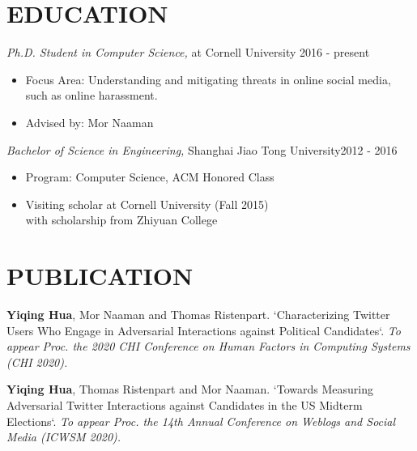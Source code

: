 \documentclass[margin, 10pt]{res} %
\begin{document}
\begin{resume}



\section{EDUCATION}

{\sl Ph.D. Student in Computer Science,} at Cornell University \hfill 2016 - present \\
\begin{itemize}
\item Focus Area: Understanding and mitigating threats in online social media, such as online harassment.
\item Advised by: Mor Naaman
\end{itemize}
{\sl Bachelor of Science in Engineering,} Shanghai Jiao Tong University\hfill 2012 - 2016\\
\begin{itemize}
\item Program: Computer Science, ACM Honored Class
\item Visiting scholar at Cornell University (Fall 2015) \\with scholarship from Zhiyuan College
\end{itemize}


\section{PUBLICATION}

\textbf{Yiqing Hua}, Mor Naaman and Thomas Ristenpart.
`Characterizing Twitter Users Who Engage in Adversarial Interactions against Political Candidates`.
\textit{To appear Proc. the 2020 CHI Conference on Human Factors in Computing Systems (CHI 2020).}

\textbf{Yiqing Hua}, Thomas Ristenpart and Mor Naaman.
`Towards Measuring Adversarial Twitter Interactions against Candidates in the US Midterm Elections`.
\textit{To appear Proc. the 14th Annual Conference on Weblogs and Social Media (ICWSM 2020).}


\end{resume}
\end{document}
